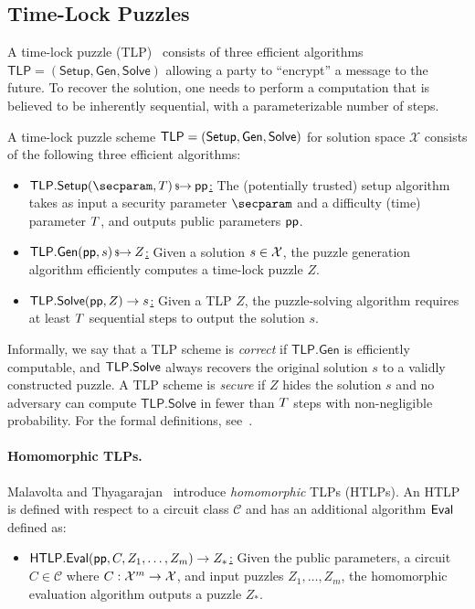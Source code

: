 \subsection{Time-Lock Puzzles}\label{sec:tlp}

A time-lock puzzle (TLP)~\cite{RivShaWag96} consists of three efficient algorithms $\mathsf{TLP} = (\mathsf{Setup}, \mathsf{Gen}, \mathsf{Solve})$ allowing a party to ``encrypt'' a message to the future. To recover the solution, one needs to perform a computation that is believed to be inherently sequential, with a parameterizable number of steps.

\begin{definition} A time-lock puzzle scheme $\sf TLP = (\mathsf{Setup}, \mathsf{Gen}, \mathsf{Solve})$ for solution space $\mathcal{X}$ consists of the following three efficient algorithms:
    \begin{itemize}
        \item \underline{$\mathsf{TLP.Setup}(\secparam, \Ttime) \randout \pparam$:} The (potentially trusted) setup algorithm takes as input a security parameter $\secparam$ and a difficulty (time) parameter $T$, and outputs public parameters $\mathsf{pp}$. %
        \item \underline{$\mathsf{TLP.Gen}(\mathsf{pp}, s) \,{\mbox{\scriptsize${\$}$\normalsize}\!\!\to}\hskip2.3pt Z$:} Given a solution $s \in \mathcal{X}$, the puzzle generation algorithm efficiently computes a time-lock puzzle $Z$.
        \item \underline{$\mathsf{TLP.Solve}(\mathsf{pp}, Z) \rightarrow s$:} Given a TLP $Z$, the puzzle-solving algorithm requires at least $T$ sequential steps to output the solution $s$.
    \end{itemize}
\end{definition}

Informally, we say that a TLP scheme is \emph{correct} if $\mathsf{TLP.Gen}$ is efficiently computable, and $\mathsf{TLP}.{\sf Solve}$ always recovers the original solution $s$ to a validly constructed puzzle. A TLP scheme is \emph{secure} if $Z$ hides the solution $s$ and no adversary can compute $\mathsf{TLP.Solve}$ in fewer than $T$ steps with non-negligible probability. For the formal definitions, see~\cite{C:MalThy19}.

\paragraph{Homomorphic TLPs.}
Malavolta and Thyagarajan~\cite{C:MalThy19} introduce \emph{homomorphic} TLPs (HTLPs). An HTLP is defined with respect to a circuit class $\mathcal{C}$ and has an additional algorithm $\sf Eval$ defined as:
\begin{itemize}
    \item \underline{$\mathsf{HTLP}.{\sf Eval}(\mathsf{pp}, C, Z_1, \dots, Z_m) \rightarrow Z_*$:} Given the public parameters, a circuit $C \in \mathcal{C}$ where $C: \mathcal{X}^m \rightarrow \mathcal{X}$, and input puzzles $Z_1, \dots, Z_m$, the homomorphic evaluation algorithm outputs a puzzle $Z_*$.
\end{itemize}

